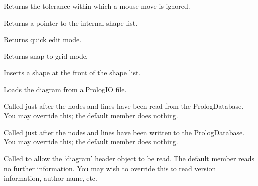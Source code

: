 Returns the tolerance within which a mouse move is ignored.



Returns a pointer to the internal shape list.



Returns quick edit mode.



Returns snap-to-grid mode.



Inserts a shape at the front of the shape list.



Loads the diagram from a PrologIO file.



Called just after the nodes and lines have been read from the PrologDatabase. You may override this;
the default member does nothing.




Called just after the nodes and lines have been written to the PrologDatabase. You may override this;
the default member does nothing.



Called to allow the `diagram' header object to be read. The default member reads no further information.
You may wish to override this to read version information, author name, etc.




